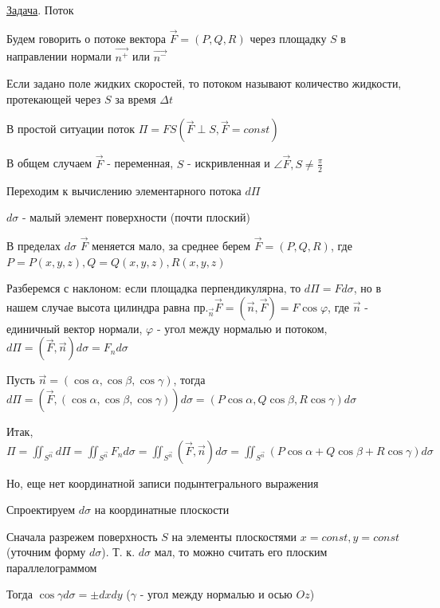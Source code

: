 \documentclass[12pt]{article}
\begin{document}
    \underline{Задача}. Поток

    Будем говорить о потоке вектора $\overrightarrow{F} = (P, Q, R)$ через площадку $S$ в направлении нормали $\overrightarrow{n^+}$ или $\overrightarrow{n^-}$

    Если задано поле жидких скоростей, то потоком называют количество жидкости, протекающей через $S$ за время $\Delta t$

    В простой ситуации поток $\Pi = FS (\overrightarrow{F} \perp S, \overrightarrow{F} = const)$

    В общем случаем $\overrightarrow{F}$ - переменная, $S$ - искривленная и $\angle \overrightarrow{F}, S \neq \frac{\pi}{2}$

    Переходим к вычислению элементарного потока $d\Pi$

    $d\sigma$ - малый элемент поверхности (почти плоский)

    В пределах $d\sigma$ $\overrightarrow{F}$ меняется мало, за среднее берем $\overrightarrow{F} = (P, Q, R)$, где $P = P(x, y, z), Q = Q(x, y, z), R(x, y, z)$

    Разберемся с наклоном: если площадка перпендикулярна, то $d\Pi = F d\sigma$,
    но в нашем случае высота цилиндра равна $\text{пр.}_{\overrightarrow{n}} \overrightarrow{F} = (\overrightarrow{n}, \overrightarrow{F}) = F \cos\varphi$, где $\overrightarrow{n}$ - единичный вектор нормали, $\varphi$ - угол между нормалью и потоком,
    $d\Pi = (\overrightarrow{F}, \overrightarrow{n}) d\sigma = F_n d\sigma$

    Пусть $\overrightarrow{n} = (\cos\alpha, \cos\beta, \cos\gamma)$, тогда $d\Pi = (\overrightarrow{F}, (\cos\alpha, \cos\beta, \cos\gamma)) d\sigma =
    (P\cos\alpha, Q\cos\beta, R\cos\gamma)d\sigma$

    Итак, $\Pi = \iint_{S^{\overrightarrow{n}}} d\Pi = \iint_{S^{\overrightarrow{n}}} F_n d\sigma = \iint_{S^{\overrightarrow{n}}} (\overrightarrow{F}, \overrightarrow{n})d\sigma = \iint_{S^{\overrightarrow{n}}} (P\cos\alpha + Q\cos\beta + R\cos\gamma)d\sigma$

    Но, еще нет координатной записи подынтегрального выражения

    Спроектируем $d\sigma$ на координатные плоскости

    Сначала разрежем поверхность $S$ на элементы плоскостями $x = const, y = const$ (уточним форму $d\sigma$). Т. к. $d\sigma$ мал, то можно считать его плоским параллелограммом

    Тогда $\cos\gamma d\sigma = \pm dxdy$ ($\gamma$ - угол между нормалью и осью $Oz$)
\end{document}
